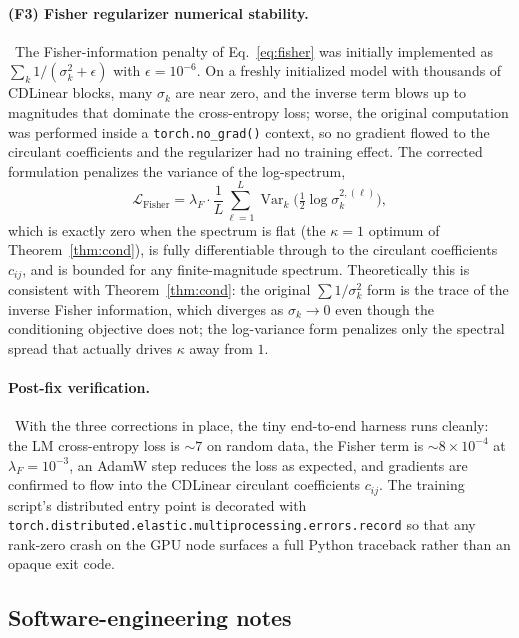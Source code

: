 \documentclass[aps,prx,onecolumn,11pt,nofootinbib,longbibliography]{revtex4-2}
\newcommand{\loss}{\mathcal{L}}
\begin{document}
\paragraph{(F3) Fisher regularizer numerical stability.}~The
Fisher-information penalty of Eq.~\ref{eq:fisher} was initially
implemented as $\sum_k 1/(\sigma_k^2 + \epsilon)$ with $\epsilon=10^{-6}$.
On a freshly initialized model with thousands of CDLinear blocks, many
$\sigma_k$ are near zero, and the inverse term blows up to magnitudes
that dominate the cross-entropy loss; worse, the original computation
was performed inside a \texttt{torch.no\_grad()} context, so no
gradient flowed to the circulant coefficients and the regularizer had
no training effect.  The corrected formulation penalizes the variance
of the log-spectrum,
\begin{equation}
\loss_\textrm{Fisher} = \lambda_F \cdot
\frac{1}{L}\sum_{\ell=1}^{L} \operatorname{Var}_k\bigl(\tfrac{1}{2}\log\sigma_k^{2,(\ell)}\bigr),
\label{eq:fisher_v2}
\end{equation}
which is exactly zero when the spectrum is flat (the
$\kappa=1$ optimum of Theorem~\ref{thm:cond}), is fully differentiable
through to the circulant coefficients $c_{ij}$, and is bounded for any
finite-magnitude spectrum.  Theoretically this is consistent with
Theorem~\ref{thm:cond}: the original $\sum 1/\sigma_k^2$ form is the
trace of the inverse Fisher information, which diverges as
$\sigma_k\to 0$ even though the conditioning objective does not; the
log-variance form penalizes only the spectral spread that actually
drives $\kappa$ away from $1$.

\paragraph{Post-fix verification.}~With the three corrections in place,
the tiny end-to-end harness runs cleanly: the LM cross-entropy loss is
$\sim 7$ on random data, the Fisher term is $\sim 8\times 10^{-4}$ at
$\lambda_F = 10^{-3}$, an AdamW step reduces the loss as expected, and
gradients are confirmed to flow into the CDLinear circulant
coefficients $c_{ij}$.  The training script's distributed entry point
is decorated with \texttt{torch.distributed.elastic.multiprocessing.\allowbreak errors.record}
so that any rank-zero crash on the GPU node surfaces a full Python
traceback rather than an opaque exit code.

\subsection{Software-engineering notes}
\end{document}
